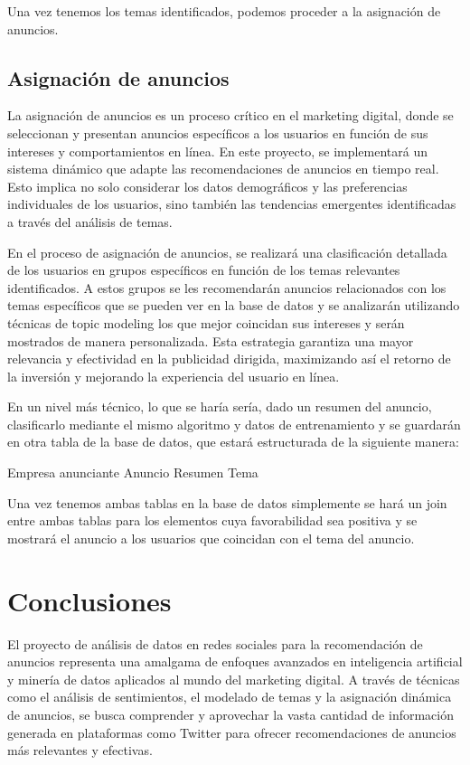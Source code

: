 \documentclass[
  letterpaper,
  DIV=11,
  numbers=noendperiod]{scrartcl}
\begin{document}
Una vez tenemos los temas identificados, podemos proceder a la
asignación de anuncios.

\subsection{Asignación de anuncios}\label{asignaciuxf3n-de-anuncios}

La asignación de anuncios es un proceso crítico en el marketing digital,
donde se seleccionan y presentan anuncios específicos a los usuarios en
función de sus intereses y comportamientos en línea. En este proyecto,
se implementará un sistema dinámico que adapte las recomendaciones de
anuncios en tiempo real. Esto implica no solo considerar los datos
demográficos y las preferencias individuales de los usuarios, sino
también las tendencias emergentes identificadas a través del análisis de
temas.

En el proceso de asignación de anuncios, se realizará una clasificación
detallada de los usuarios en grupos específicos en función de los temas
relevantes identificados. A estos grupos se les recomendarán anuncios
relacionados con los temas específicos que se pueden ver en la base de
datos y se analizarán utilizando técnicas de topic modeling los que
mejor coincidan sus intereses y serán mostrados de manera personalizada.
Esta estrategia garantiza una mayor relevancia y efectividad en la
publicidad dirigida, maximizando así el retorno de la inversión y
mejorando la experiencia del usuario en línea.

En un nivel más técnico, lo que se haría sería, dado un resumen del
anuncio, clasificarlo mediante el mismo algoritmo y datos de
entrenamiento y se guardarán en otra tabla de la base de datos, que
estará estructurada de la siguiente manera:

Empresa anunciante \textbar{} Anuncio \textbar{} Resumen \textbar{} Tema
\textbar{}

Una vez tenemos ambas tablas en la base de datos simplemente se hará un
join entre ambas tablas para los elementos cuya favorabilidad sea
positiva y se mostrará el anuncio a los usuarios que coincidan con el
tema del anuncio.

\section{Conclusiones}\label{conclusiones}

El proyecto de análisis de datos en redes sociales para la recomendación
de anuncios representa una amalgama de enfoques avanzados en
inteligencia artificial y minería de datos aplicados al mundo del
marketing digital. A través de técnicas como el análisis de
sentimientos, el modelado de temas y la asignación dinámica de anuncios,
se busca comprender y aprovechar la vasta cantidad de información
generada en plataformas como Twitter para ofrecer recomendaciones de
anuncios más relevantes y efectivas.
\end{document}

